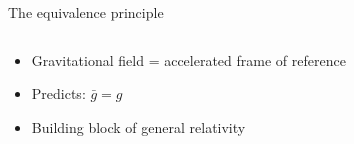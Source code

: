 \documentclass{beamer}
\begin{document}
  
\begin{frame}{\centering The equivalence principle}
  \begin{columns}
    \begin{column}{0.39\textwidth}
        \begin{itemize}
        \item{Gravitational field = accelerated frame of reference}
         \item{Predicts: $\bar g= g$}
         \item{Building block of general relativity}
           \begin{itemize}
           \end{itemize}
         
      \end{itemize}
    \end{column}
    \begin{column}{0.65\textwidth}
      \begin{figure}
      \end{figure}
    \end{column}
  \end{columns}
  \end{frame}
\end{document}

